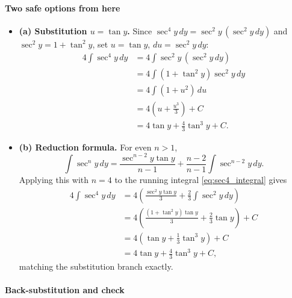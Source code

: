 \paragraph{Two safe options from here}
\begin{itemize}
  \item \textbf{(a) Substitution \(u=\tan y\).} Since \(\sec^4 y\, dy = \sec^2 y\,(\sec^2 y\, dy)\) and \(\sec^2 y = 1 + \tan^2 y\), set \(u=\tan y\), \(du=\sec^2 y\, dy\):
  \[
  \begin{aligned}
  4 \int \sec^4 y\, dy
    &= 4 \int \sec^2 y\,(\sec^2 y\, dy) \\
    &= 4 \int (1+\tan^2 y)\sec^2 y\, dy \\
    &= 4 \int (1+u^2)\, du \\
    &= 4\left(u + \tfrac{u^3}{3}\right)+C \\
    &= 4\tan y + \tfrac{4}{3}\tan^3 y + C.
  \end{aligned}
  \]
  \item \textbf{(b) Reduction formula.} For even \(n>1\),
  \[
    \int \sec^{n} y \, dy = \frac{\sec^{n-2} y \tan y}{n-1} + \frac{n-2}{n-1} \int \sec^{n-2} y \, dy.
  \]
  Applying this with \(n=4\) to the running integral \eqref{eq:sec4_integral} gives
  \[
  \begin{aligned}
  4\int \sec^{4} y \, dy
    &= 4\left(\frac{\sec^{2} y \tan y}{3} + \frac{2}{3}\int \sec^{2} y \, dy\right) \\
    &= 4\left(\frac{(1+\tan^2 y)\tan y}{3} + \frac{2}{3}\tan y\right) + C \\
    &= 4\left(\tan y + \tfrac{1}{3}\tan^{3} y\right) + C \\
    &= 4\tan y + \tfrac{4}{3}\tan^{3} y + C,
  \end{aligned}
  \]
  matching the substitution branch exactly.
  \end{itemize}

\paragraph{Back-substitution and check}

